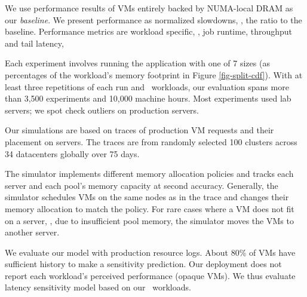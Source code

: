 We use performance results of VMs entirely backed by NUMA-local DRAM as our \emph{baseline}.
We present \cvn performance as
normalized slowdowns, \ie, the ratio to the baseline. Performance metrics are workload specific, \eg, job runtime, throughput and tail latency, \etc

Each experiment involves running the application with one of 7 \cvn sizes (as percentages of the workload's memory footprint in Figure \ref{fig-split-cdf}).
With at least three repetitions of each run and \numTotalApps\ workloads, our evaluation spans more than 3,500 experiments and 10,000 machine hours.
Most experiments used lab servers; we spot check outliers on production servers.

Our simulations are based on traces of production VM requests and their placement on servers.
The traces are from randomly selected 100 clusters across 34 datacenters globally over 75 days.

The simulator implements different memory allocation policies and tracks each server and each pool's memory capacity at second accuracy.
Generally, the simulator schedules VMs on the same nodes as in the trace and changes their memory allocation to match the policy.
For rare cases where a VM does not fit on a server, \eg, due to insufficient pool memory, the simulator moves the VMs to another server.

We evaluate our model with production resource logs.
About 80\% of VMs have sufficient history to make a sensitivity prediction.
Our deployment does not report each workload's perceived performance (opaque VMs).
We thus evaluate latency sensitivity model based on our \numTotalApps\ workloads.



